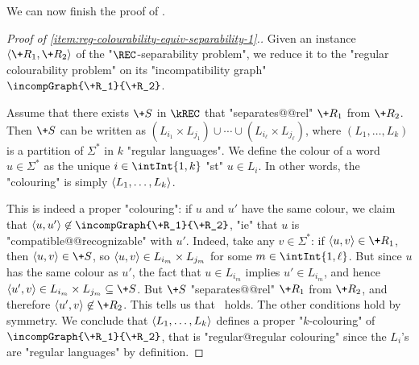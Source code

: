 We can now finish the proof of .

\begin{proof}[Proof of \eqref{item:reg-colourability-equiv-separability-1}.]
    \AP Given an instance $\tup{\+R_1,\+R_2}$ of the "$\REC$-separability problem", we
    reduce it to the "regular colourability problem" on its "incompatibility graph"
    $\incompGraph{\+R_1}{\+R_2}$.

    Assume that there exists $\+S$ in $\kREC$ that "separates@@rel" $\+R_1$ from $\+R_2$.
    Then $\+S$ can be written as $(L_{i_1}\times L_{j_1}) \cup \cdots \cup (L_{i_\ell}\times L_{j_\ell})$, 
    where $(L_1,\dotsc,L_k)$ is a partition of $\Sigma^*$ in $k$ "regular languages".
    We define the colour of a word $u \in \Sigma^*$ as the unique $i \in \intInt{1,k}$
    "st" $u \in L_i$. In other words, the "colouring" is simply $\langle L_1,\dotsc,L_k\rangle$. 

    This is indeed a proper "colouring": if $u$ and $u'$ have the same colour,
    we claim that $\tup{u,u'} \not\in \incompGraph{\+R_1}{\+R_2}$, "ie" that
    $u$ is "compatible@@recognizable" with $u'$. Indeed, take any $v \in \Sigma^*$: if $\tup{u,v} \in \+R_1$,
    then $\tup{u,v} \in \+S$, so $\langle u,v\rangle \in L_{i_m}\times L_{j_m}$ for some $m \in \intInt{1,\ell}$. But since $u$ has the same colour 
    as $u'$, the fact that $u \in L_{i_m}$ implies $u' \in L_{i_m}$, and hence 
    $\tup{u',v} \in L_{i_m}\times L_{j_m}\subseteq \+S$.
    But $\+S$ "separates@@rel" $\+R_1$ from $\+R_2$, and therefore $\tup{u',v} \not\in \+R_2$.
    This tells us that \compL\ holds. The other conditions hold by symmetry.
    We conclude that $\langle L_1,\dotsc,L_k\rangle$ defines
    a proper "$k$-colouring" of $\incompGraph{\+R_1}{\+R_2}$, that is "regular@regular colouring" since the $L_i$'s are "regular languages" by definition.


\end{proof}
